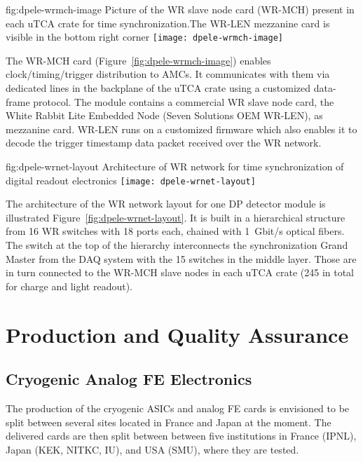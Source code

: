 \begin{dunefigure}{fig:dpele-wrmch-image}
{Picture of the WR slave node card (WR-MCH) present in each uTCA crate for time synchronization.The WR-LEN mezzanine card is visible in the bottom right corner}
\texttt{[image: dpele-wrmch-image]}
\end{dunefigure}

The WR-MCH card (Figure~\ref{fig:dpele-wrmch-image}) enables clock/timing/trigger distribution to AMCs. It communicates with them via dedicated lines in the backplane of the uTCA crate using a customized data-frame protocol. The module contains a commercial WR slave node card, the White Rabbit Lite Embedded Node (Seven Solutions OEM WR-LEN), as mezzanine card. WR-LEN runs on a customized firmware which also enables it to decode the trigger timestamp data packet received over the WR network.

\begin{dunefigure}{fig:dpele-wrnet-layout}
{Architecture of WR network for time synchronization of digital readout electronics}
\texttt{[image: dpele-wrnet-layout]}
\end{dunefigure}

The architecture of the WR network layout for one DP detector module is illustrated Figure~\ref{fig:dpele-wrnet-layout}. It is built in a hierarchical structure from \num{16} WR switches with \num{18} ports each,  chained with \SI{1}{Gbit/s} optical fibers. The switch at the top of the hierarchy interconnects the synchronization Grand Master from the DAQ system with the \num{15} switches in the middle layer. Those are in turn connected to the WR-MCH slave nodes in each uTCA crate (245 in total for charge and light readout). 



\section{Production and Quality Assurance}
\label{sec:fddp-tpc-elec-prod-assy}

\subsection{Cryogenic Analog FE Electronics}
\label{sec:fddp-tpc-elec-prod-fe}
The production of the cryogenic ASICs and analog FE cards is envisioned to be split between several sites located in France and Japan at the moment. The delivered cards are then split between between five institutions in France (IPNL), Japan (KEK, NITKC, IU), and USA (SMU), where they are tested. 

